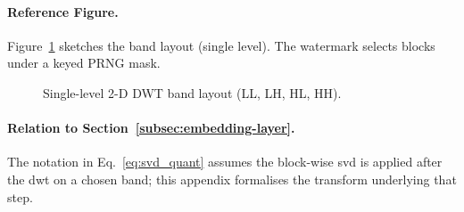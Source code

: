 \paragraph{Reference Figure.} Figure~\ref{fig:dwt_layout_ref} sketches the band
layout (single level).
The watermark selects blocks under a keyed PRNG mask.

\begin{figure}[ht]
  \centering
  
  \caption{Single-level 2-D DWT band layout (LL, LH, HL, HH).}
  \label{fig:dwt_layout_ref}
\end{figure}

\paragraph[Relation to Section ref{subsec:embedding-layer}.]{Relation to Section~\ref{subsec:embedding-layer}.} The notation in
Eq.~\eqref{eq:svd_quant} assumes the block-wise \gls{svd} is applied after the \gls{dwt} on
a chosen band; this appendix formalises the transform underlying that step.
